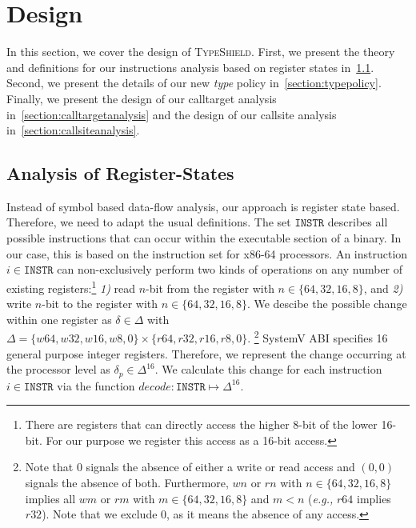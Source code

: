 \section{Design}
\label{chapter:Design}

In this section, we cover the design of \textsc{TypeShield}. 
First, we present the theory and definitions for our instructions analysis based on register states in~\cref{section:instructionanalysis}. 
Second, we present the details of our new \emph{type} policy in~\cref{section:typepolicy}. 
Finally, we present the design of our calltarget analysis in~\cref{section:calltargetanalysis} and the design of our 
callsite analysis in~\cref{section:callsiteanalysis}.

\subsection{Analysis of Register-States}
\label{section:instructionanalysis}
Instead of symbol based data-flow analysis, our approach is register state based. Therefore, we need to adapt the usual definitions.
The set $\texttt{INSTR}$ describes all possible instructions that can occur within the executable section of a binary. In our case,
this is based on the instruction set for x86-64 processors.
An instruction $i \in \texttt{INSTR}$ can non-exclusively perform two kinds of operations on any number of existing 
registers:\footnote{There are registers that can directly access the higher 
8-bit of the lower 16-bit. For our purpose we register this access as a 16-bit access.}
\textit{1)} read $n$-bit from the register with $n \in \{ 64, 32, 16, 8 \}$, and 
\textit{2)} write $n$-bit to the register with $n \in \{ 64, 32, 16, 8 \}$.
We descibe the possible change within one register 
as $\delta \in \Delta$ with $\Delta = \{ w64, w32, w16, w8, 0 \} \times \{r64, r32, r16, r8, 0 \}$. \footnote{Note that 0 signals the absence
of either a write or read access and $(0, 0)$ signals the absence of both. Furthermore, $wn$ or $rn$ with $n \in \{64,32,16,8\}$ implies all $wm$ or $rm$ 
with $m \in \{64,32,16,8\}$ and $m < n$ (\textit{e.g.,} $r64$ implies $r32$). Note that we exclude 0, as it means the absence of any access.}
SystemV ABI specifies 16 general purpose integer registers. Therefore, we represent the change occurring at the processor level as $\delta_p \in \Delta^{16}$. 
We calculate this change for each instruction $i \in \texttt{INSTR}$ via the function $decode : \texttt{INSTR} \mapsto \Delta^{16}$.


